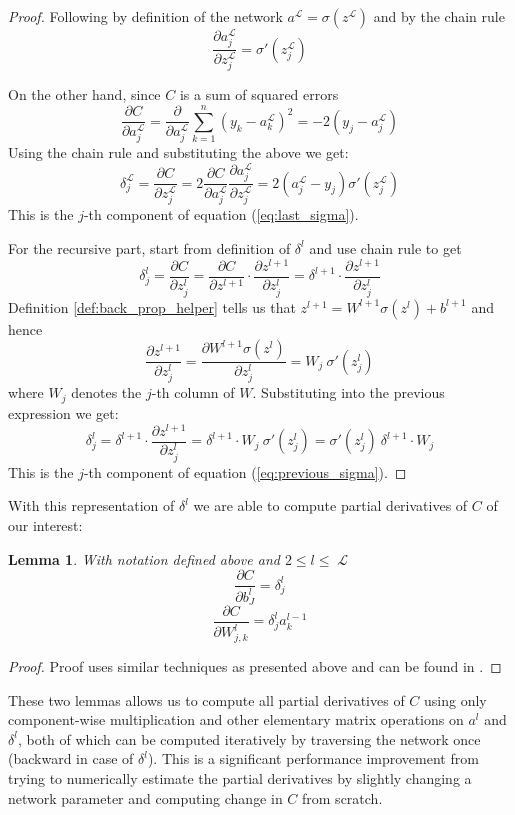 \documentclass[a4paper,11pt]{article}
\theoremstyle{break}
\newtheorem{lemma}[theorem]{Lemma}
\newcommand{\Part}[2]{\frac{\partial #1}{\partial #2}}
\DeclareMathOperator{\La}{\mathcal{L}}
\begin{document}
\begin{proof}
    Following \cite{higham} by definition of the network 
    $a^{\La} = \sigma(z^{\La})$ and by the chain rule
    $$ \Part{a_j^{\La}}{z_j^{\La}} = \sigma' (z_j^{\La}) $$
    
    On the other hand, since $C$ is a sum of squared errors
    $$ \Part{C}{a_j^{\La}} = \Part{}{a_j^{\La}} \sum_{k=1}^n (y_k - a_k^{\La})^2 = -2 (y_j - a_j^{\La})$$
    Using the chain rule and substituting the above we get:
    $$ \delta_j^{\La} = \Part{C}{z_j^{\La}} = 2 \Part{C}{a_j^{\La}} \Part{a_j^{\La}}{z_j^{\La}} = 2 (a_j^{\La} - y_j) \sigma' (z_j^{\La})$$
    This is the $j$-th component of equation (\ref{eq:last_sigma}).
    
    For the recursive part, start from definition of $\delta^l$ and use chain rule to get
    $$ \delta^l_j = \Part{C}{z_j^l} =
       \Part{C}{z^{l+1}} \cdot \Part{z^{l+1}}{z_j^l} = 
       \delta^{l+1}      \cdot \Part{z^{l+1}}{z_j^l} $$
    Definition \ref{def:back_prop_helper} tells us that
    $ z^{l+1} = W^{l+1} \sigma(z^{l}) + b^{l+1} $
    and hence
    $$  \Part{z^{l+1}}{z^l_j} =
        \Part{W^{l+1} \sigma(z^l)}{z_j^l} = W_{j} ~ \sigma'(z_j^l)$$
    where $W_{j}$ denotes the $j$-th column of $W$. Substituting into the previous expression we get:
    $$ \delta^l_j = \delta^{l+1} \cdot \Part{z^{l+1}}{z_j^l}
     = \delta^{l+1} \cdot W_{j} ~ \sigma'(z_j^l) = \sigma'(z_j^l) ~ \delta^{l+1} \cdot W_{j}$$
    This is the $j$-th component of equation (\ref{eq:previous_sigma}).
\end{proof}

With this representation of $\delta^l$ we are able to compute partial derivatives of $C$ of our interest:
\begin{lemma}
    With notation defined above and $ 2 \leq l \leq \La$
     $$ \Part{C}{b_J^l} = \delta_j^l $$
     $$ \Part{C}{W^l_{j, k}} = \delta^l_j a_k^{l-1} $$
\end{lemma}
\begin{proof}
    Proof uses similar techniques as presented above and can be found in \cite[p14]{higham}.
\end{proof}

These two lemmas allows us to compute all partial derivatives of $C$ using only component-wise multiplication and other elementary matrix operations on $a^l$ and $\delta^l$, both of which can be computed iteratively by traversing the network once (backward in case of $\delta^l$).
This is a significant performance improvement from trying to numerically estimate the partial derivatives by slightly changing a network parameter and computing change in $C$ from scratch.
\end{document}
